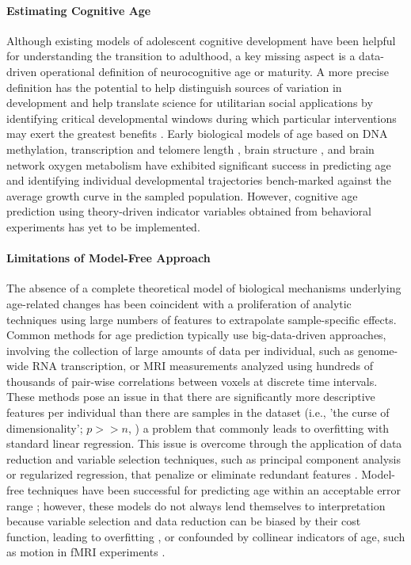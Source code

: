 \documentclass[utf8]{stylesheet}
\begin{document}
\paragraph{Estimating Cognitive Age}
Although existing models of adolescent cognitive development have been helpful for understanding the transition to adulthood, a key missing aspect is a data-driven operational definition of neurocognitive age or maturity. A more precise definition has the potential to help distinguish sources of variation in development and help translate science for utilitarian social applications by identifying critical developmental windows during which particular interventions may exert the greatest benefits \citep{somerville2016searching}. Early biological models of age based on DNA methylation, transcription and telomere length \citep{baker1988biomarkers, jylhava2017biological}, brain structure \citep{khundrakpam2015prediction,aycheh2018biological,madan2018predicting}, and brain network oxygen metabolism \citep{dosenbach2010prediction, qin2015predicting} have exhibited significant success in predicting age and identifying individual developmental trajectories bench-marked against the average growth curve in the sampled population. However, cognitive age prediction using theory-driven indicator variables obtained from behavioral experiments has yet to be implemented. 
%
\paragraph{Limitations of Model-Free Approach} 
The absence of a complete theoretical model of biological mechanisms underlying age-related changes has been coincident with a proliferation of analytic techniques using large numbers of features to extrapolate sample-specific effects. Common methods for age prediction typically use big-data-driven approaches, involving the collection of large amounts of data per individual, such as genome-wide RNA transcription, or MRI measurements analyzed using hundreds of thousands of pair-wise correlations between voxels at discrete time intervals. These methods pose an issue in that there are significantly more descriptive features per individual than there are samples in the dataset (i.e., 'the curse of dimensionality'; $p >> n$, \cite{taylor2019}) \textemdash a problem that commonly leads to overfitting with standard linear regression. This issue is overcome through the application of data reduction and variable selection techniques, such as principal component analysis or regularized regression, that penalize or eliminate redundant features \citep{lee2017medical}. Model-free techniques have been successful for predicting age within an acceptable error range \citep{cole2017predicting}; however, these models do not always lend themselves to interpretation because variable selection and data reduction can be biased by their cost function, leading to overfitting \citep{babyak2004you}, or confounded by collinear indicators of age, such as motion in fMRI experiments \citep{satterthwaite2013heterogeneous}.
%
\end{document}
